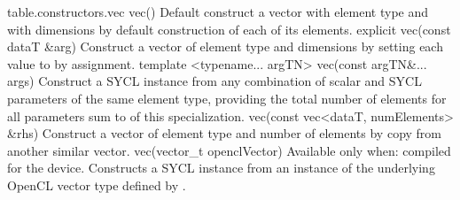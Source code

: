 

{table.constructors.vec}
  \addRow
    {vec()}
    {
      Default construct a vector with element type  and
      with  dimensions by default construction of
      each of its elements.
    }
  \addRow
    {explicit vec(const dataT \&arg)}
    {
      Construct a vector of element type  and
       dimensions by setting each value to  by
      assignment.
    }
  \addRowTwoL
    {template <typename... argTN>}
    {vec(const argTN\&... args)}
    {
      Construct a SYCL  instance from any combination of scalar and SYCL  parameters of the same element type, providing the total number of elements for all parameters sum to  of this  specialization.
    }    
  \addRow
    {vec(const vec<dataT, numElements> \&rhs)}
    {
      Construct a vector of element type  and number of elements  by copy from another similar vector.
    }
  \addRow
    {vec(vector_t openclVector)}
    {
      Available only when: compiled for the device.
      \newline
      Constructs a SYCL  instance from an instance of the underlying OpenCL vector type defined by .
    }
\completeTable

